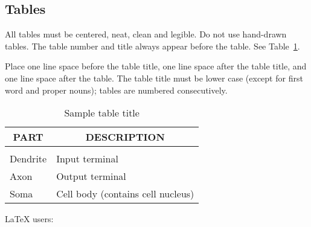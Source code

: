 \documentclass{article} %
\begin{document}
\subsection{Tables}

All tables must be centered, neat, clean and legible. Do not use hand-drawn
tables. The table number and title always appear before the table. See
Table~\ref{sample-table}.

Place one line space before the table title, one line space after the table
title, and one line space after the table. The table title must be lower case
(except for first word and proper nouns); tables are numbered consecutively.

\begin{table}[t]
\caption{Sample table title}
\label{sample-table}
\begin{center}
\begin{tabular}{ll}
\multicolumn{1}{c}{\bf PART}  &\multicolumn{1}{c}{\bf DESCRIPTION}
\\ \hline \\
Dendrite         &Input terminal \\
Axon             &Output terminal \\
Soma             &Cell body (contains cell nucleus) \\
\end{tabular}
\end{center}
\end{table}

LaTeX users:
\end{document}
